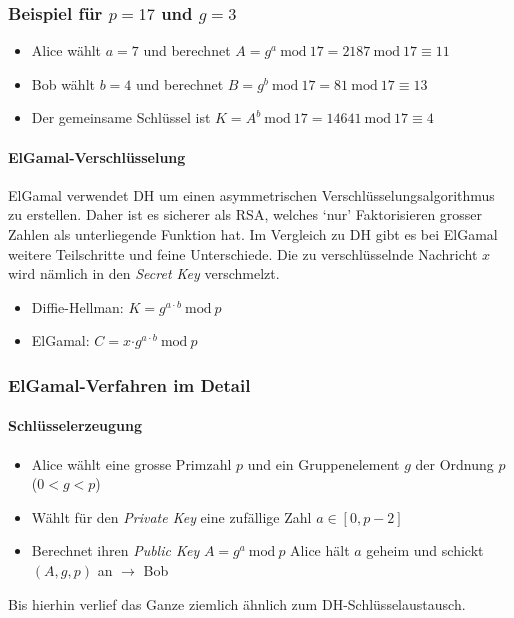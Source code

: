 \documentclass[10pt,a4paper]{article}
\begin{document}
\subsubsection*{Beispiel für $p=17$ und $g=3$}
\begin{itemize}[noitemsep,topsep=0pt,leftmargin=*]
    \item Alice wählt $a=7$ und berechnet $A = g^a\ \mathrm{mod}\ 17 = 2187\ \mathrm{mod}\ 17 \equiv 11$
    \item Bob wählt $b=4$ und berechnet $B = g^b\ \mathrm{mod}\ 17 = 81\ \mathrm{mod}\ 17 \equiv 13$
    \item Der gemeinsame Schlüssel ist $K = A^b\ \mathrm{mod}\ 17 = 14641\ \mathrm{mod}\ 17 \equiv 4$
\end{itemize}

\paragraph*{ElGamal-Verschlüsselung}ElGamal verwendet DH um einen asymmetrischen Verschlüsselungsalgorithmus zu erstellen. Daher ist es sicherer als RSA, welches `nur' Faktorisieren grosser Zahlen als unterliegende Funktion hat. Im Vergleich zu DH gibt es bei ElGamal weitere Teilschritte und feine Unterschiede. Die zu verschlüsselnde Nachricht {\color{red}$x$} wird nämlich in den \textsl{Secret Key} verschmelzt.
\begin{itemize}[noitemsep,topsep=0pt,leftmargin=*]
    \item Diffie-Hellman: {\color{dunkelblau}$K= g^{a\cdot b}\ \mathrm{mod}\ p$}
    \item ElGamal: {\color{dunkelblau}$C= ${\color{red}$x$}$\cdot g^{a\cdot b}\ \mathrm{mod}\ p$}
\end{itemize}


\subsubsection*{ElGamal-Verfahren im Detail}
\paragraph*{Schlüsselerzeugung}
\begin{itemize}[noitemsep,topsep=0pt,leftmargin=*]
    \item Alice wählt eine {\color{dunkelblau}grosse Primzahl $p$} und ein {\color{dunkelblau}Gruppenelement $g$ der Ordnung $p$} ($0<g<p$)
    \item Wählt für den \textsl{Private Key} eine {\color{dunkelblau}zufällige Zahl $a\in[0,p-2]$}
    \item Berechnet ihren \textsl{Public Key} {\color{dunkelblau}$A=g^a\ \mathrm{mod}\ p$}
    \subitem Alice hält {\color{dunkelblau}$a$ geheim} und schickt $(A, g, p)$ an $\rightarrow$ Bob
\end{itemize}
Bis hierhin verlief das Ganze ziemlich ähnlich zum DH-Schlüsselaustausch.
\end{document}
